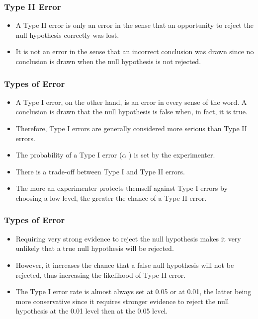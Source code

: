 \documentclass[]{beamer}
\begin{document}
 \begin{frame}
 \Large
 \frametitle{Type II Error}
 \begin{itemize}
\item A Type II error is only an error in the sense that an opportunity to reject the null hypothesis correctly was lost.
\item It is not an error in the sense that an incorrect conclusion was drawn since no conclusion is drawn when the null hypothesis is not rejected.
\end{itemize}
\end{frame}
\begin{frame}
\Large
\frametitle{Types of Error}

\begin{itemize}
\item
A Type I error, on the other hand, is an error in every sense of the word. A conclusion is drawn that the null hypothesis is false when, in fact, it is true. \item Therefore, Type I errors are generally considered more serious than Type II errors.
\item
The probability of a Type I error ($\alpha$ ) is set by the experimenter. \item There is a trade-off between Type I and Type II errors. \item The more an experimenter protects themself against Type I errors by choosing a low level, the greater the chance of a Type II error.
\end{itemize}
\end{frame}
\begin{frame}
\frametitle{Types of Error}
\Large
\begin{itemize}
\item
Requiring very strong evidence to reject the null hypothesis makes it very unlikely that a true null hypothesis will be rejected. \item However, it increases the chance that a false null hypothesis will not be rejected, thus increasing the likelihood of Type II error.
\item
The Type I error rate is almost always set at 0.05 or at 0.01, the latter being more conservative since it requires stronger evidence to reject the null hypothesis at the 0.01 level then at the 0.05 level.
\end{itemize}
\end{frame}
\end{document}
